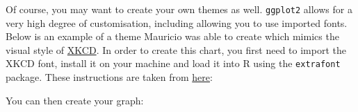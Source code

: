 Of course, you may want to create your own themes as well.
\texttt{ggplot2} allows for a very high degree of customisation,
including allowing you to use imported fonts. Below is an example of a
theme Mauricio was able to create which mimics the visual style of
\href{http://xkcd.com/}{XKCD}. In order to create this chart, you first
need to import the XKCD font, install it on your machine and load it
into R using the \texttt{extrafont} package. These instructions are
taken from
\href{https://www.google.com.au/url?sa=t\&rct=j\&q=\&esrc=s\&source=web\&cd=1\&ved=0ahUKEwiWzafchdPJAhVBpJQKHe_LDT8QFggbMAA\&url=https\%3A\%2F\%2Fcran.r-project.org\%2Fweb\%2Fpackages\%2Fxkcd\%2Fvignettes\%2Fxkcd-intro.pdf\&usg=AFQjCNE-KciGY14e-Q1buYIVmTFC0ht__Q\&sig2=DZUwkvIHwfNWtTtkcz94jg}{here}:

\begin{Shaded}
\begin{Highlighting}[]

\NormalTok{(}\NormalTok{, }
\StringTok{      }\NormalTok{, }\NormalTok{)}
\NormalTok{(}\NormalTok{)}
\NormalTok{(}\NormalTok{)}
\NormalTok{(} \NormalTok{, }\NormalTok{)}
\NormalTok{()}
\NormalTok{()}
\end{Highlighting}
\end{Shaded}

You can then create your graph:

